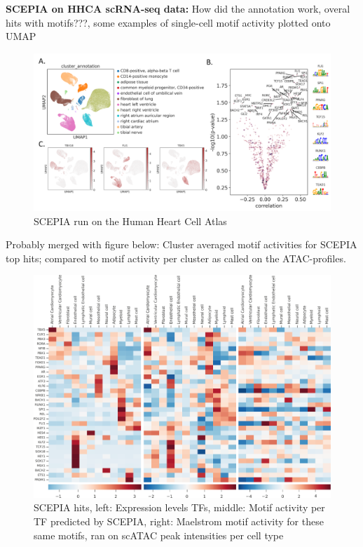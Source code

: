 \textbf{SCEPIA on HHCA scRNA-seq data: }
How did the annotation work, overal hits with motifs???, some examples of single-cell motif activity plotted onto UMAP
\begin{figure}
    \centering
    \includegraphics[width=0.75\linewidth]{ch.scepia/imgs/SCEPIAonHHCA.png}
    \caption{SCEPIA run on the Human Heart Cell Atlas}
    \label{fig:scepia_hhca1}
\end{figure}



Probably merged with figure below: Cluster averaged motif activities for SCEPIA top hits; compared to motif activity per cluster as called on the ATAC-profiles.

\begin{figure}
    \centering
    \includegraphics[width=0.75\linewidth]{ch.scepia/imgs/Middel 1SCEPIAhitsHHCA.png}
    \caption{SCEPIA hits, left: Expression levels TFs, middle: Motif activity per TF predicted by SCEPIA, right: Maelstrom motif activity for these same motifs, ran on scATAC peak intensities per cell type
    }
    \label{fig:scepia_hhca2}
\end{figure}

